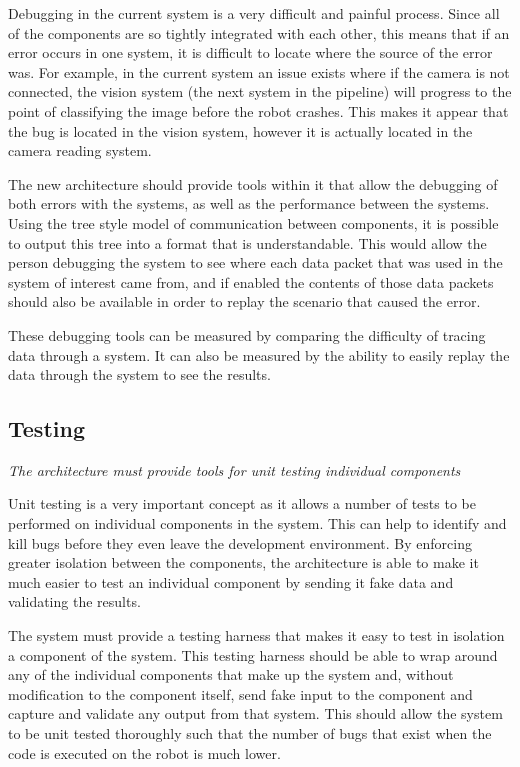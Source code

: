 \documentclass[english,12pt]{scrartcl}
\newcommand{\requirement}[1]{\textit{#1}}
\begin{document}
			Debugging in the current system is a very difficult and painful process. Since all of
			the components are so tightly integrated with each other, this means that if an error
			occurs in one system, it is difficult to locate where the source of the error was. For
			example, in the current system an issue exists where if the camera is not connected, the
			vision system (the next system in the pipeline) will progress to the point of
			classifying the image before the robot crashes. This makes it appear that the bug is
			located in the vision system, however it is actually located in the camera reading
			system.

			The new architecture should provide tools within it that allow the debugging of both
			errors with the systems, as well as the performance between the systems. Using the tree
			style model of communication between components, it is possible to output this tree into
			a format that is understandable. This would allow the person debugging the system to see
			where each data packet that was used in the system of interest came from, and if enabled
			the contents of those data packets should also be available in order to replay the
			scenario that caused the error.

			These debugging tools can be measured by comparing the difficulty of tracing data through a system. It can also be measured by the ability to easily replay the data through the system to see the results.

		\subsection{Testing}
			\requirement{The architecture must provide tools for unit testing individual components}

			Unit testing is a very important concept as it allows a number of tests to be performed
			on individual components in the system. This can help to identify and kill bugs before
			they even leave the development environment. By enforcing greater isolation between the
			components, the architecture is able to make it much easier to test an individual
			component by sending it fake data and validating the results.

			The system must provide a testing harness that makes it easy to test in isolation a
			component of the system. This testing harness should be able to wrap around any of the
			individual components that make up the system and, without modification to the component
			itself, send fake input to the component and capture and validate any output from that
			system. This should allow the system to be unit tested thoroughly such that the number
			of bugs that exist when the code is executed on the robot is much lower.
\end{document}

